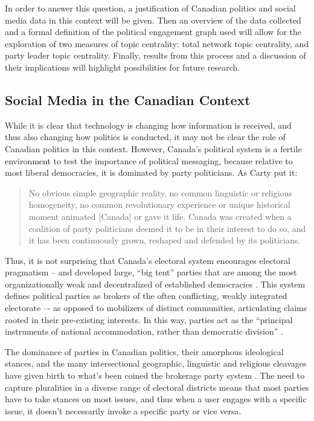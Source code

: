 In order to answer this question, a justification of Canadian politics and
social media data in this context will be given. Then an overview of the data
collected and a formal definition of the political engagement graph used will
allow for the exploration of two measures of topic centrality: total network
topic centrality, and party leader topic centrality. Finally, results from this
process and a discussion of their implications will highlight possibilities for
future research.  

\subsection{Social Media in the Canadian Context}

While it is clear that technology is changing how information is received, and
thus also changing how politics is conducted, it may not be clear the role of
Canadian politics in this context. However, Canada’s political system is a
fertile environment to test the importance of political messaging, because
relative to most liberal democracies, it is dominated by party
politicians. As Carty put it: 

\begin{quote}
  No obvious simple geographic reality, no common linguistic or religious
  homogeneity, no common revolutionary experience or unique historical moment
  animated [Canada] or gave it life. Canada was created when a coalition of party
  politicians deemed it to be in their interest to do so, and it has been
  continuously grown, reshaped and defended by its politicians.\cite{carty2010political}
\end{quote}

Thus, it is not surprising that Canada’s electoral system
encourages electoral pragmatism – and developed large, ``big tent'' parties that
are among the most organizationally weak and decentralized of established
democracies \cite{carty2010political}. This system defines political parties as brokers of the often
conflicting, weakly integrated electorate –- as opposed to mobilizers of
distinct communities, articulating claims rooted in their pre-existing
interests. In this way, parties act as the ``principal instruments of national
accommodation, rather than democratic division'' \cite{carty2010political}.

The dominance of parties in Canadian politics, their amorphous ideological
stances, and the many intersectional geographic, linguistic and religious
cleavages have given birth to what’s been coined the brokerage party system
\cite{carty2010political}. The need to capture pluralities in a diverse range of
electoral districts means that most parties have to take stances on most issues,
and thus when a user engages with a specific issue, it doesn’t necessarily
invoke a specific party or vice versa. 

